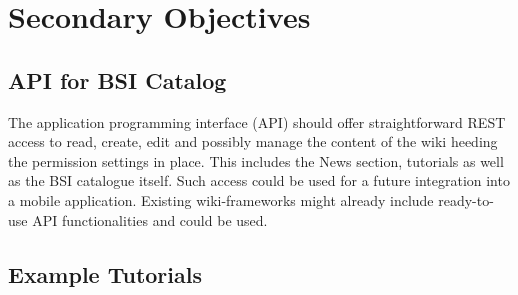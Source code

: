 \chapter{Secondary Objectives}
\section{API for BSI Catalog}

The application programming interface (API) should offer straightforward REST access to read, create, edit and possibly manage the content of the wiki heeding the permission settings in place.
This includes the News section, tutorials as well as the BSI catalogue itself.
Such access could be used for a future integration into a mobile application.
Existing wiki-frameworks might already include ready-to-use API functionalities and could be used.

\section{Example Tutorials}
